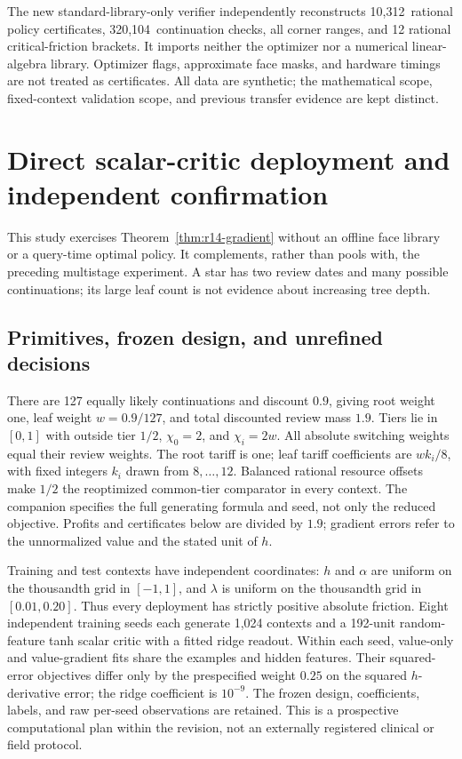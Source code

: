 \documentclass[11pt,letterpaper]{article}
\theoremstyle{definition}
\newcommand{\1}{\mathbf 1}
\newcommand{\RThirteenPolicies}{10,312}
\newcommand{\RThirteenChecks}{320,104}
\begin{document}
The new standard-library-only verifier independently reconstructs \RThirteenPolicies\ rational policy certificates, \RThirteenChecks\ continuation checks, all corner ranges, and 12 rational critical-friction brackets. It imports neither the optimizer nor a numerical linear-algebra library. Optimizer flags, approximate face masks, and hardware timings are not treated as certificates. All data are synthetic; the mathematical scope, fixed-context validation scope, and previous transfer evidence are kept distinct.



\section{Direct scalar-critic deployment and independent confirmation}\label{sec:r14-experiment}
This study exercises Theorem~\ref{thm:r14-gradient} without an offline face library or a query-time optimal policy. It complements, rather than pools with, the preceding multistage experiment. A star has two review dates and many possible continuations; its large leaf count is not evidence about increasing tree depth.

\subsection{Primitives, frozen design, and unrefined decisions}
There are 127 equally likely continuations and discount $0.9$, giving root weight one, leaf weight $w=0.9/127$, and total discounted review mass $1.9$. Tiers lie in $[0,1]$ with outside tier $1/2$, $\chi_0=2$, and $\chi_i=2w$. All absolute switching weights equal their review weights. The root tariff is one; leaf tariff coefficients are $w k_i/8$, with fixed integers $k_i$ drawn from $8,\ldots,12$. Balanced rational resource offsets make $1/2$ the reoptimized common-tier comparator in every context. The companion specifies the full generating formula and seed, not only the reduced objective. Profits and certificates below are divided by $1.9$; gradient errors refer to the unnormalized value and the stated unit of $h$.

Training and test contexts have independent coordinates: $h$ and $\alpha$ are uniform on the thousandth grid in $[-1,1]$, and $\lambda$ is uniform on the thousandth grid in $[0.01,0.20]$. Thus every deployment has strictly positive absolute friction. Eight independent training seeds each generate 1,024 contexts and a 192-unit random-feature tanh scalar critic with a fitted ridge readout. Within each seed, value-only and value-gradient fits share the examples and hidden features. Their squared-error objectives differ only by the prespecified weight $0.25$ on the squared $h$-derivative error; the ridge coefficient is $10^{-9}$. The frozen design, coefficients, labels, and raw per-seed observations are retained. This is a prospective computational plan within the revision, not an externally registered clinical or field protocol.
\end{document}
